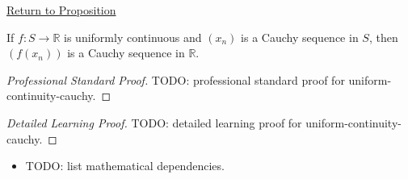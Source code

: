 \newpage
{}
\label{prf:uniform-continuity-cauchy}

\begin{remark*}[Return]
\hyperref[prop:uniform-continuity-cauchy]{Return to Proposition}
\end{remark*}

\begin{proposition*}
If $f \colon S \to \mathbb{R}$ is uniformly continuous and $(x_{n})$ is a Cauchy sequence in $S$, then $(f(x_{n}))$ is a Cauchy sequence in $\mathbb{R}$.
\end{proposition*}

\begin{proof}[Professional Standard Proof]
\LRAProofBodyStart
TODO: professional standard proof for uniform-continuity-cauchy.
\end{proof}

\begin{proof}[Detailed Learning Proof]
\LRAProofBodyStart
TODO: detailed learning proof for uniform-continuity-cauchy.
\end{proof}

\begin{remark*}
\end{remark*}

\begin{dependencies}
\begin{itemize}
  \item TODO: list mathematical dependencies.
\end{itemize}
\end{dependencies}

\clearpage
